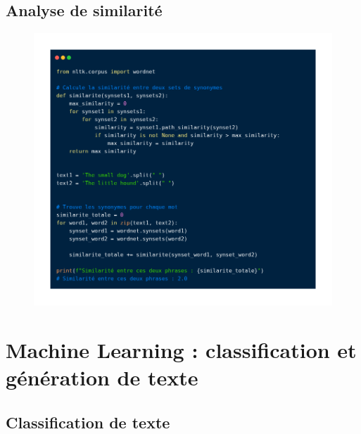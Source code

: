 \subsection{Analyse de similarité}

\begin{frame}{\subsecname}
\begin{figure}[ht]
\includegraphics[scale=.26]{img/similarite_nltk.png}
\end{figure}
\end{frame}

\section{Machine Learning : classification et génération de texte}

\subsection{Classification de texte}

